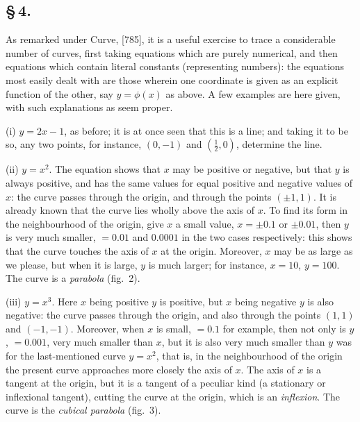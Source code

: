 \documentclass[11pt,a4paper]{article}
\begin{document}
\subsection*{\S\,4.}

As remarked under Curve, [785], it is a useful exercise to trace a considerable number of curves, first taking equations which are purely numerical, and then equations which contain literal constants (representing numbers): the equations most easily dealt with are those wherein one coordinate is given as an explicit function of the other, say $y = \phi(x)$ as above. A few examples are here given, with such explanations as seem proper.

(i) $y = 2x - 1$, as before; it is at once seen that this is a line; and taking it to be so, any two points, for instance, $(0, -1)$ and $(\frac{1}{2}, 0)$, determine the line.

(ii) $y = x^{2}$. The equation shows that $x$ may be positive or negative, but that $y$ is always positive, and has the same values for equal positive and negative values of $x$: the curve passes through the origin, and through the points $(\pm 1, 1)$. It is already known that the curve lies wholly above the axis of $x$. To find its form in the neighbourhood of the origin, give $x$ a small value, $x = \pm 0.1$ or $\pm 0.01$, then $y$ is very much smaller, $= 0.01$ and $0.0001$ in the two cases respectively: this shows that the curve touches the axis of $x$ at the origin. Moreover, $x$ may be as large as we please, but when it is large, $y$ is much larger; for instance, $x = 10$, $y = 100$. The curve is a \textit{parabola} (fig.~2).

(iii) $y = x^{3}$. Here $x$ being positive $y$ is positive, but $x$ being negative $y$ is also negative: the curve passes through the origin, and also through the points $(1, 1)$ and $(-1, -1)$. Moreover, when $x$ is small, $= 0.1$ for example, then not only is $y$, $= 0.001$, very much smaller than $x$, but it is also very much smaller than $y$ was for the last-mentioned curve $y = x^{2}$, that is, in the neighbourhood of the origin the present curve approaches more closely the axis of $x$. The axis of $x$ is a tangent at the origin, but it is a tangent of a peculiar kind (a stationary or inflexional tangent), cutting the curve at the origin, which is an \textit{inflexion}. The curve is the \textit{cubical parabola} (fig.~3).
\end{document}
